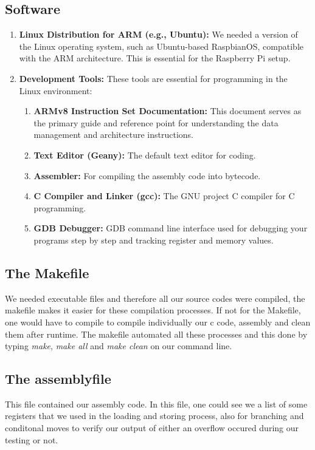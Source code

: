 \subsection*{Software}
\begin{enumerate}[label=\arabic*.]
    \item \textbf{Linux Distribution for ARM (e.g., Ubuntu):} We needed a version of the Linux operating system, such as Ubuntu-based RaspbianOS, compatible with the ARM architecture. This is essential for the Raspberry Pi setup.
    \item \textbf{Development Tools:} These tools are essential for programming in the Linux environment:
    \begin{enumerate}[label=\alph*.]
        \item \textbf{ARMv8 Instruction Set Documentation:} This document serves as the primary guide and reference point for understanding the data management and architecture instructions.
        \item \textbf{Text Editor (Geany):} The default text editor for coding.
        \item \textbf{Assembler:} For compiling the assembly code into bytecode.
        \item \textbf{C Compiler and Linker (gcc):} The GNU project C compiler for C programming.
        \item \textbf{GDB Debugger:} GDB command line interface used for debugging your programs step by step and tracking register and memory values.
    \end{enumerate}
\end{enumerate}
\subsection*{The Makefile}
We needed executable files and therefore all our source codes were compiled, the makefile makes it easier for these compilation processes.
If not for the Makefile, one would have to compile to compile individually our c code, assembly and clean them after runtime.
The makefile automated all these processes and this done by typing \textit{make}, \textit{make all} and \textit{make clean} on our 
command line.
\subsection*{The assemblyfile}
This file contained our assembly code. In this file, one could see we a list of some registers that we used in the loading and 
storing process, also for branching and conditonal moves to verify our output of either an overflow occured during our testing or not.
